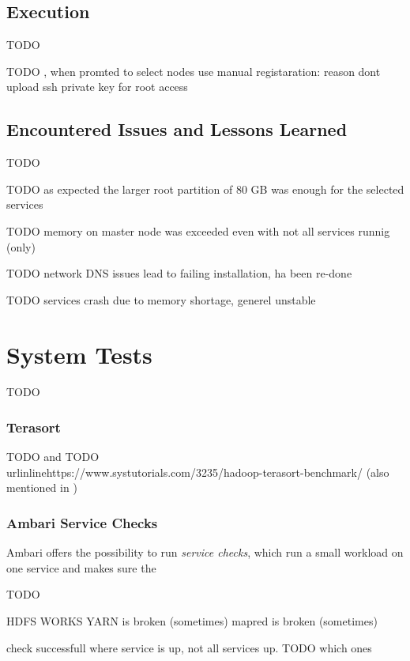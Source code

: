 \subsection{Execution}
TODO

TODO ,  when promted to select nodes use manual registaration: reason dont upload ssh private key for root access 

\subsection{Encountered Issues and Lessons Learned}
TODO

TODO as expected the larger root partition of 80 GB was enough for the selected services

TODO memory on master node was exceeded even with not all services runnig (only)

TODO network DNS issues lead to failing installation, ha been re-done

TODO services crash due to memory shortage, generel unstable


\section{System Tests}

TODO

\subsubsection{Terasort}

TODO and \autocite{omally2008terasort}
TODO \\urlinline{https://www.systutorials.com/3235/hadoop-terasort-benchmark/} (also mentioned in \autocite[][]{white2015hadoop})

\subsubsection{Ambari Service Checks}

Ambari offers the possibility to run \emph{service checks}, which run a small workload on one service and makes sure the 

TODO

HDFS WORKS
YARN is broken (sometimes)
mapred is broken (sometimes)

check successfull where service is up, not all services up. TODO which ones

